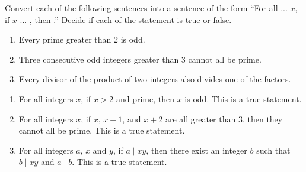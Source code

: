 \documentclass{article}
\theoremstyle{definition}
\begin{document}
\begin{question}
   Convert each of the following sentences into a sentence of the form ``For all ... $x$, if $x$ ... , then .'' Decide if each of the statement is true or false.
    \begin{enumerate}
        \item Every prime greater than 2 is odd.
        \item Three consecutive odd integers greater than 3 cannot all be prime.
        \item Every divisor of the product of two integers also divides one of the factors.
    \end{enumerate}
\end{question}
\begin{solution}
    \begin{enumerate}
        \item For all integers $x$, if $x>2$ and prime, then $x$ is odd. This is a true statement. 
        \item For all integers $x$, if $x$, $x+1$, and $x+2$ are all greater than 3, then they cannot all be prime. This is a true statement.
        \item For all integers $a$, $x$ and $y$, if $a \mid xy$, then there exist an integer $b$ such that $b \mid xy$ and $a \mid b$. This is a true statement.
    \end{enumerate}
\end{solution}
\end{document}
